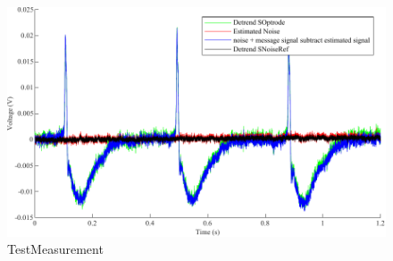 \begin{figure}[h]
\centering
\includegraphics[width=1\linewidth]{4-ANC_Sys/TestMeasurement.pdf}
\caption{TestMeasurement}
\label{fig_TestMeasurement}
\end{figure}

